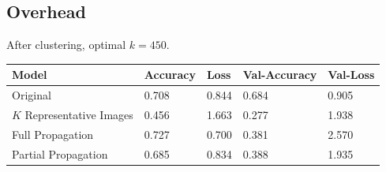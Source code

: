 \documentclass[10pt]{article}
\begin{document}
\subsection{Overhead}
  After clustering, optimal $k = 450$.
    \begin{table}[h]
        \begin{center}
            \begin{tabular}{|l|l|l|l|l|}
                \hline
                Model &Accuracy &Loss &Val-Accuracy &Val-Loss \\
                \hline
                Original &0.708 &0.844 &0.684 &0.905 \\
                $K$ Representative Images &0.456 &1.663 &0.277 &1.938 \\
                Full Propagation &0.727 &0.700 &0.381 &2.570 \\
                Partial Propagation &0.685 &0.834 &0.388 &1.935 \\
                \hline
            \end{tabular}
        \end{center}
    \end{table}
\end{document}
